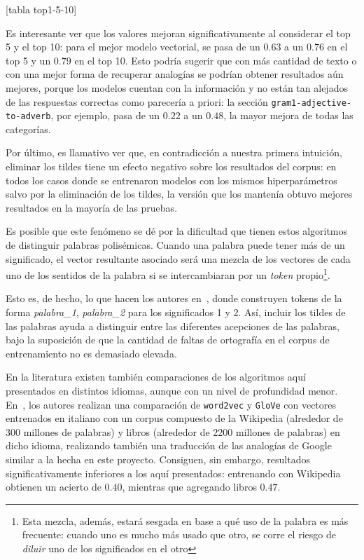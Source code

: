 [tabla top1-5-10]

Es interesante ver que los valores mejoran significativamente al considerar el top 5 y el top 10:
para el mejor modelo vectorial, se pasa de un $0.63$ a un $0.76$ en el top 5 y un $0.79$ en el top
10. Esto podría sugerir que con más cantidad de texto o con una mejor forma de recuperar analogías
se podrían obtener resultados aún mejores, porque los modelos cuentan con la información y no están
tan alejados de las respuestas correctas como parecería a priori: la sección
\texttt{gram1-adjective-to-adverb}, por ejemplo, pasa de un $0.22$ a un $0.48$, la mayor mejora de
todas las categorías.


Por último, es llamativo ver que, en contradicción a nuestra primera intuición, eliminar los tildes
tiene un efecto negativo sobre los resultados del corpus: en todos los casos donde se entrenaron
modelos con los mismos hiperparámetros salvo por la eliminación de los tildes, la versión que los
mantenía obtuvo mejores resultados en la mayoría de las pruebas.

Es posible que este fenómeno se dé por la dificultad que tienen estos algoritmos de distinguir
palabras polisémicas. Cuando una palabra puede tener más de un significado, el vector resultante
asociado será una mezcla de los vectores de cada uno de los sentidos de la palabra si se
intercambiaran por un \textit{token} propio\footnote{Esta mezcla, además, estará sesgada en base a
qué uso de la palabra es más frecuente: cuando uno es mucho más usado que otro, se corre el riesgo
de \textit{diluir} uno de los significados en el otro}.

Esto es, de hecho, lo que hacen los autores en~\cite{Huang2012,Tian2014}, donde construyen tokens de
la forma \textit{palabra\_1}, \textit{palabra\_2} para los significados 1 y 2. Así, incluir los
tildes de las palabras ayuda a distinguir entre las diferentes acepciones de las palabras, bajo la
suposición de que la cantidad de faltas de ortografía en el corpus de entrenamiento no es demasiado
elevada.

En la literatura existen también comparaciones de los algoritmos aquí presentados en distintos
idiomas, aunque con un nivel de profundidad menor. En~\cite{Berardi2015}, los autores realizan una
comparación de \texttt{word2vec} y \texttt{GloVe} con vectores entrenados en italiano con un corpus
compuesto de la Wikipedia (alrededor de 300 millones de palabras) y libros (alrededor de 2200
millones de palabras) en dicho idioma, realizando también una traducción de las analogías de Google
similar a la hecha en este proyecto. Consiguen, sin embargo, resultados significativamente
inferiores a los aquí presentados: entrenando con Wikipedia obtienen un acierto de $0.40$, mientras
que agregando libros $0.47$.

